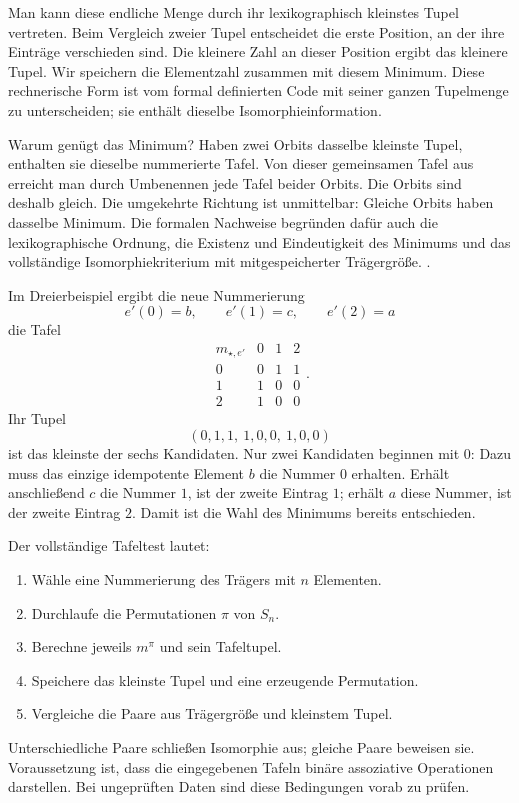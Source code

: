 Man kann diese endliche Menge durch ihr lexikographisch kleinstes
Tupel vertreten. Beim Vergleich zweier Tupel entscheidet die erste
Position, an der ihre Einträge verschieden sind. Die kleinere Zahl
an dieser Position ergibt das kleinere Tupel. Wir speichern die
Elementzahl zusammen mit diesem Minimum. Diese rechnerische Form
ist vom formal definierten Code mit seiner ganzen Tupelmenge zu
unterscheiden; sie enthält dieselbe Isomorphieinformation.

Warum genügt das Minimum? Haben zwei Orbits dasselbe kleinste Tupel,
enthalten sie dieselbe nummerierte Tafel. Von dieser gemeinsamen
Tafel aus erreicht man durch Umbenennen jede Tafel beider Orbits.
Die Orbits sind deshalb gleich. Die umgekehrte Richtung ist
unmittelbar: Gleiche Orbits haben dasselbe Minimum. Die formalen
Nachweise begründen dafür auch die lexikographische Ordnung, die
Existenz und Eindeutigkeit des Minimums und das vollständige
Isomorphiekriterium mit mitgespeicherter Trägergröße.
.

Im Dreierbeispiel ergibt die neue Nummerierung
\[
  e'(0)=b,\qquad e'(1)=c,\qquad e'(2)=a
\]
die Tafel
\[
  \begin{array}{c|ccc}
    m_{\star,e'}&0&1&2\\\hline
    0&0&1&1\\
    1&1&0&0\\
    2&1&0&0
  \end{array}.
\]
Ihr Tupel
\[
  (0,1,1,\ 1,0,0,\ 1,0,0)
\]
ist das kleinste der sechs Kandidaten. Nur zwei Kandidaten beginnen
mit \(0\): Dazu muss das einzige idempotente Element \(b\) die
Nummer \(0\) erhalten. Erhält anschließend \(c\) die Nummer \(1\),
ist der zweite Eintrag \(1\); erhält \(a\) diese Nummer, ist der
zweite Eintrag \(2\). Damit ist die Wahl des Minimums bereits
entschieden.

\begin{samepage}
Der vollständige Tafeltest lautet:
\begin{enumerate}
  \setlength{\itemsep}{0pt}
  \setlength{\parsep}{0pt}
  \item Wähle eine Nummerierung des Trägers mit \(n\) Elementen.
  \item Durchlaufe die Permutationen \(\pi\) von \(S_n\).
  \item Berechne jeweils \(m^\pi\) und sein Tafeltupel.
  \item Speichere das kleinste Tupel und eine erzeugende Permutation.
  \item Vergleiche die Paare aus Trägergröße und kleinstem Tupel.
\end{enumerate}
\end{samepage}
Unterschiedliche Paare schließen Isomorphie aus; gleiche Paare
beweisen sie. Voraussetzung ist, dass die eingegebenen Tafeln
binäre assoziative Operationen darstellen. Bei ungeprüften Daten
sind diese Bedingungen vorab zu prüfen.

